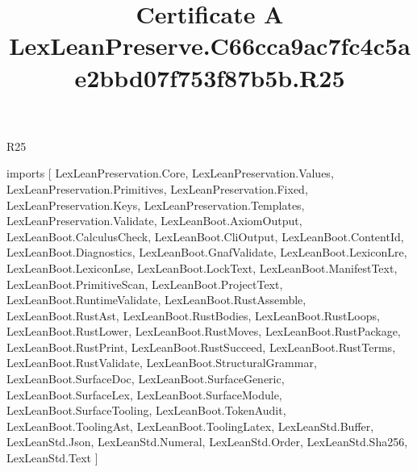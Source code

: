 \begin{lexlean}{R25}
\title{Certificate A LexLeanPreserve.C66cca9ac7fc4c5ae2bbd07f753f87b5b.R25}
\begin{coremodule}
imports [
  LexLeanPreservation.Core,
  LexLeanPreservation.Values,
  LexLeanPreservation.Primitives,
  LexLeanPreservation.Fixed,
  LexLeanPreservation.Keys,
  LexLeanPreservation.Templates,
  LexLeanPreservation.Validate,
  LexLeanBoot.AxiomOutput,
  LexLeanBoot.CalculusCheck,
  LexLeanBoot.CliOutput,
  LexLeanBoot.ContentId,
  LexLeanBoot.Diagnostics,
  LexLeanBoot.GnafValidate,
  LexLeanBoot.LexiconLre,
  LexLeanBoot.LexiconLse,
  LexLeanBoot.LockText,
  LexLeanBoot.ManifestText,
  LexLeanBoot.PrimitiveScan,
  LexLeanBoot.ProjectText,
  LexLeanBoot.RuntimeValidate,
  LexLeanBoot.RustAssemble,
  LexLeanBoot.RustAst,
  LexLeanBoot.RustBodies,
  LexLeanBoot.RustLoops,
  LexLeanBoot.RustLower,
  LexLeanBoot.RustMoves,
  LexLeanBoot.RustPackage,
  LexLeanBoot.RustPrint,
  LexLeanBoot.RustSucceed,
  LexLeanBoot.RustTerms,
  LexLeanBoot.RustValidate,
  LexLeanBoot.StructuralGrammar,
  LexLeanBoot.SurfaceDoc,
  LexLeanBoot.SurfaceGeneric,
  LexLeanBoot.SurfaceLex,
  LexLeanBoot.SurfaceModule,
  LexLeanBoot.SurfaceTooling,
  LexLeanBoot.TokenAudit,
  LexLeanBoot.ToolingAst,
  LexLeanBoot.ToolingLatex,
  LexLeanStd.Buffer,
  LexLeanStd.Json,
  LexLeanStd.Numeral,
  LexLeanStd.Order,
  LexLeanStd.Sha256,
  LexLeanStd.Text
]


\end{coremodule}
\end{lexlean}
